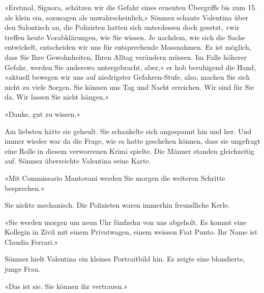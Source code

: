 «Erstmal, Signora, schätzen wir die Gefahr eines erneuten Übergriffs bis
zum 15. als klein ein, sozusagen als unwahrscheinlich,» Sönmez schaute
Valentina über den Salontisch an, die Polizisten hatten sich unterdessen
doch gesetzt, «wir treffen heute Vorabklärungen, wie Sie wissen. Je
nachdem, wie sich die Sache entwickelt, entscheiden wir uns für
entsprechende Massnahmen. Es ist möglich, dass Sie Ihre Gewohnheiten,
Ihren Alltag verändern müssen. Im Falle höherer Gefahr, werden Sie
anderswo untergebracht, aber,» er hob beruhigend die Hand, «aktuell
bewegen wir uns auf niedrigster Gefahren-Stufe, also, machen Sie sich
nicht zu viele Sorgen. Sie können uns Tag und Nacht erreichen. Wir sind
für Sie da. Wir lassen Sie nicht hängen.»

«Danke, gut zu wissen.»

Am liebsten hätte sie geheult. Sie schaukelte sich angespannt hin und
her. Und immer wieder war da die Frage, wie es hatte geschehen können,
dass sie ungefragt eine Rolle in diesem verworrenen Krimi spielte.
Die Männer standen gleichzeitig auf. Sönmez überreichte Valentina seine
Karte.

«Mit Commissario Mantovani werden Sie morgen die weiteren Schritte
besprechen.»

Sie nickte mechanisch. Die Polizisten waren immerhin freundliche Kerle.

«Sie werden morgen um neun Uhr fünfzehn von uns abgeholt. Es kommt eine
Kollegin in Zivil mit einem Privatwagen, einem weissen Fiat Punto. Ihr
Name ist Claudia Ferrari.»

Sönmez hielt Valentina ein kleines Portraitbild  hin. Es zeigte eine
blondierte, junge Frau.

«Das ist sie. Sie können ihr vertrauen.»
